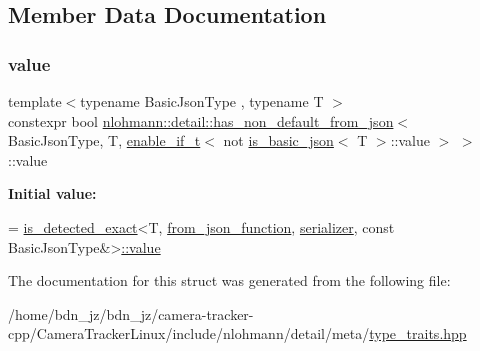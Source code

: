\subsection{Member Data Documentation}
\mbox{\label{structnlohmann_1_1detail_1_1has__non__default__from__json_3_01_basic_json_type_00_01_t_00_01enab81bd4c814ac1146ff15f3f4636933207_a1494ac5fed1163aab4a89208ff04ee85}} 
\subsubsection{\texorpdfstring{value}{value}}
{\footnotesize\ttfamily template$<$typename Basic\+Json\+Type , typename T $>$ \\
constexpr bool \hyperlink{structnlohmann_1_1detail_1_1has__non__default__from__json}{nlohmann\+::detail\+::has\+\_\+non\+\_\+default\+\_\+from\+\_\+json}$<$ Basic\+Json\+Type, T, \hyperlink{namespacenlohmann_1_1detail_a02bcbc878bee413f25b985ada771aa9c}{enable\+\_\+if\+\_\+t}$<$ not \hyperlink{structnlohmann_1_1detail_1_1is__basic__json}{is\+\_\+basic\+\_\+json}$<$ T $>$\+::value $>$ $>$\+::value\hspace{0.3cm}{\ttfamily [static]}}

{\bfseries Initial value\+:}
\begin{DoxyCode}
=
        \hyperlink{namespacenlohmann_1_1detail_a7542b4dbac07817fd4849ecfa4619def}{is\_detected\_exact}<T, \hyperlink{namespacenlohmann_1_1detail_a1711ee5cef66a0523055c8d9f024f322}{from\_json\_function}, 
      \hyperlink{structnlohmann_1_1detail_1_1has__non__default__from__json_3_01_basic_json_type_00_01_t_00_01enab81bd4c814ac1146ff15f3f4636933207_a610272ed924122e0c46d158ecdfe6faf}{serializer},
        \textcolor{keyword}{const} BasicJsonType&>\hyperlink{structnlohmann_1_1detail_1_1has__non__default__from__json_3_01_basic_json_type_00_01_t_00_01enab81bd4c814ac1146ff15f3f4636933207_a1494ac5fed1163aab4a89208ff04ee85}{::value}
\end{DoxyCode}


The documentation for this struct was generated from the following file\+:\begin{DoxyCompactItemize}
\item 
/home/bdn\+\_\+jz/bdn\+\_\+jz/camera-\/tracker-\/cpp/\+Camera\+Tracker\+Linux/include/nlohmann/detail/meta/\hyperlink{type__traits_8hpp}{type\+\_\+traits.\+hpp}\end{DoxyCompactItemize}
